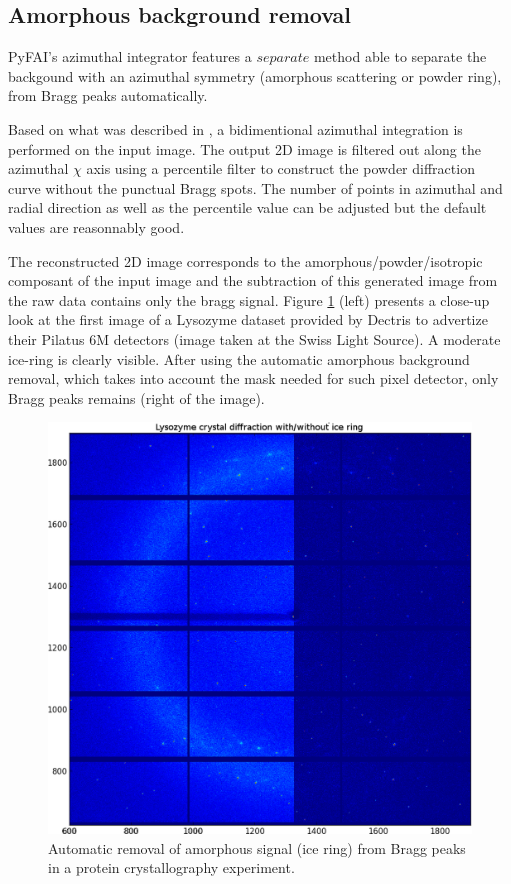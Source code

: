 \documentclass[preprint]{iucr}
\begin{document}
\subsection{Amorphous background removal}

PyFAI's azimuthal integrator features a $separate$ method able to separate
the backgound with an azimuthal symmetry (amorphous scattering or powder ring),
from Bragg peaks automatically.

Based on what was described in \cite{PyFAI_PDJ}, a bidimentional azimuthal
integration is performed on the input image.
The output 2D image is filtered out along the azimuthal $\chi$ axis using a
percentile filter to construct the powder diffraction curve without the punctual
Bragg spots.
The number of points in azimuthal and radial direction as well as
the percentile value can be adjusted but the default values are reasonnably
good.

The reconstructed 2D image corresponds to the amorphous/powder/isotropic
composant of the input image and the subtraction of this generated image from
the raw data contains only the bragg signal.
Figure \ref{separate} (left)
presents a close-up look at the first image of a Lysozyme dataset provided by Dectris to
advertize their Pilatus 6M detectors (image taken at the Swiss Light Source). A
moderate ice-ring is clearly visible. After using the automatic amorphous
background removal, which takes into account the mask needed for such pixel
detector, only Bragg peaks remains (right of the image).

\begin{figure}
\label{separate}
\begin{center}
\includegraphics[width=15cm]{merged.eps}
\caption{Automatic removal of amorphous signal (ice ring) from Bragg peaks in a
protein crystallography experiment.}
\end{center}
\end{figure}
\end{document}
